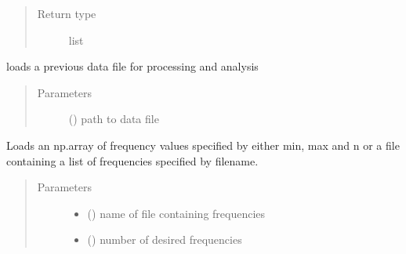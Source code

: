 \documentclass[letterpaper,10pt,english]{sphinxmanual}
\begin{document}
\begin{fulllineitems}
\begin{fulllineitems}
\begin{quote}
\begin{description}
\item[{Return type}] \leavevmode
list

\end{description}\end{quote}

\end{fulllineitems}


\begin{fulllineitems}
\label{\detokenize{source/laboratory:laboratory.setup.Setup.load_data}}
loads a previous data file for processing and analysis
\begin{quote}\begin{description}
\item[{Parameters}] \leavevmode
{} () \textendash{} path to data file

\end{description}\end{quote}

\end{fulllineitems}


\begin{fulllineitems}
\label{\detokenize{source/laboratory:laboratory.setup.Setup.load_frequencies}}
Loads an np.array of frequency values specified by either min, max and n or a file containing a list of frequencies specified by filename.
\begin{quote}\begin{description}
\item[{Parameters}] \leavevmode\begin{itemize}
\item {} 
 () \textendash{} name of file containing frequencies

\item {} 
 () \textendash{} number of desired frequencies


\end{itemize}
\end{description}
\end{quote}
\end{fulllineitems}
\end{fulllineitems}
\end{document}
